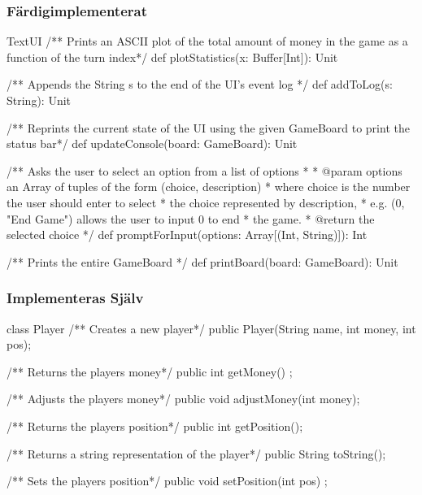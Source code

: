 \subsubsection{Färdigimplementerat}

\begin{ScalaSpec}{TextUI}
   /** Prints an ASCII plot of the total amount 
	of money in the game as a function of the turn index*/
  def plotStatistics(x: Buffer[Int]): Unit

  /** Appends the String s to the end of the UI's event log */
  def addToLog(s: String): Unit 

  /** Reprints the current state of the UI using the given
	GameBoard to print the status bar*/
  def updateConsole(board: GameBoard): Unit 

 
  /** Asks the user to select an option from a list of options
    *
    * @param options an Array of tuples of the form (choice, description)
    *                where choice is the number the user should enter to select 
    *                the choice represented by description,
    *                e.g. (0,  "End Game") allows the user to input 0 to end 
    *                the game.
    * @return        the selected choice
    */
  def promptForInput(options: Array[(Int, String)]): Int 

  /** Prints the entire GameBoard */
  def printBoard(board: GameBoard): Unit 

 
\end{ScalaSpec}



\subsubsection{Implementeras Själv}
\begin{JavaSpec}{class Player}
	/** Creates a new player*/
	public Player(String name, int money, int pos);

	/** Returns the players money*/
	public int getMoney() ;

	/** Adjusts the players money*/
	public void adjustMoney(int money);

	/** Returns the players position*/
	public int getPosition();

	/** Returns a string representation of the player*/
	public String toString();

	/** Sets the players position*/
	public void setPosition(int pos) ;

\end{JavaSpec}

